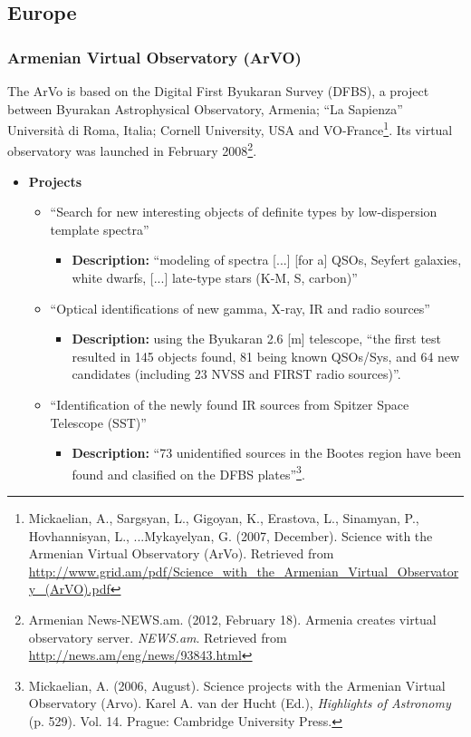 \subsection{Europe}
\subsubsection{Armenian Virtual Observatory (ArVO)}
The ArVo is based on the Digital First Byukaran Survey (DFBS), a project between
Byurakan Astrophysical Observatory, Armenia; ``La Sapienza'' Universit\`{a} di
Roma, Italia; Cornell University, USA and VO-France\footnote{Mickaelian, A.,
Sargsyan, L., Gigoyan, K., Erastova, L., Sinamyan, P., Hovhannisyan, L.,
...Mykayelyan, G. (2007, December). Science with the Armenian Virtual
Observatory (ArVo).  Retrieved from
\url{http://www.grid.am/pdf/Science_with_the_Armenian_Virtual_Observatory_(ArVO).pdf}}.
Its virtual observatory was launched in February 2008\footnote{Armenian
News-NEWS.am. (2012, February 18). Armenia creates virtual observatory server.
\textit{NEWS.am}. Retrieved from \url{http://news.am/eng/news/93843.html}}.

\begin{itemize}
\item \textbf{Projects}
\begin{itemize}
\item ``Search for new interesting objects of definite types by low-dispersion
template spectra'' 
\begin{itemize}
\item \textbf{Description:} ``modeling of spectra [...] [for a] QSOs, Seyfert
galaxies, white dwarfs, [...] late-type stars (K-M, S, carbon)'' 
\end{itemize}
\end{itemize}
\begin{itemize}
\item ``Optical identifications of new gamma, X-ray, IR and radio sources''
\begin{itemize}
\item \textbf{Description:} using the Byukaran 2.6 [m] telescope, ``the first
test resulted in 145 objects found, 81 being known QSOs/Sys, and 64 new
candidates (including 23 NVSS and FIRST radio sources)''.
\end{itemize}
\end{itemize}
\begin{itemize}
\item ``Identification of the newly found IR sources from Spitzer Space
Telescope (SST)''
\begin{itemize}
\item \textbf{Description:} ``73 unidentified sources in the Bootes region have
been found and clasified on the DFBS plates''\footnote{Mickaelian, A. (2006,
August). Science projects with the Armenian Virtual Observatory (Arvo). Karel A.
van der Hucht (Ed.), \textit{Highlights of Astronomy} (p. 529). Vol. 14. Prague:
Cambridge University
Press. }.
\end{itemize}
\end{itemize}
\end{itemize}


